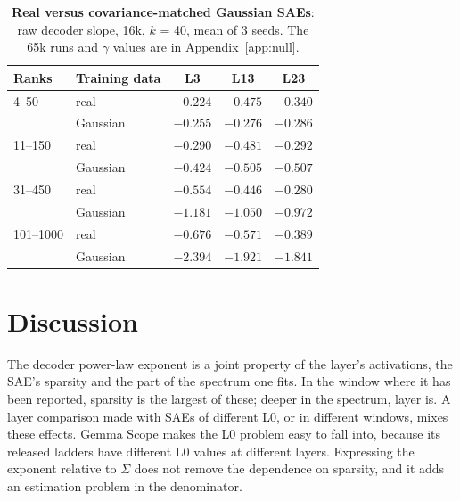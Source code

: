 \documentclass[10pt,twocolumn]{article}
\newcommand{\gam}{\gamma}
\begin{document}
\begin{table}[t]
\centering
\small
\caption{\textbf{Real versus covariance-matched Gaussian SAEs}: raw decoder slope, 16k, $k$ = 40, mean of 3 seeds. The 65k runs and $\gam$ values are in Appendix~\ref{app:null}.}
\label{tab:null}
\begin{tabular}{llccc}
\toprule
Ranks & Training data & L3 & L13 & L23 \\
\midrule
4--50 & real & $-0.224$ & $-0.475$ & $-0.340$ \\
 & Gaussian & $-0.255$ & $-0.276$ & $-0.286$ \\
11--150 & real & $-0.290$ & $-0.481$ & $-0.292$ \\
 & Gaussian & $-0.424$ & $-0.505$ & $-0.507$ \\
31--450 & real & $-0.554$ & $-0.446$ & $-0.280$ \\
 & Gaussian & $-1.181$ & $-1.050$ & $-0.972$ \\
101--1000 & real & $-0.676$ & $-0.571$ & $-0.389$ \\
 & Gaussian & $-2.394$ & $-1.921$ & $-1.841$ \\
\bottomrule
\end{tabular}
\end{table}

\section{Discussion}
\label{sec:discussion}

The decoder power-law exponent is a joint property of the layer's activations, the SAE's sparsity and the part of the spectrum one fits. In the window where it has been reported, sparsity is the largest of these; deeper in the spectrum, layer is. A layer comparison made with SAEs of different L0, or in different windows, mixes these effects. Gemma Scope makes the L0 problem easy to fall into, because its released ladders have different L0 values at different layers. Expressing the exponent relative to $\Sigma$ does not remove the dependence on sparsity, and it adds an estimation problem in the denominator.
\end{document}
